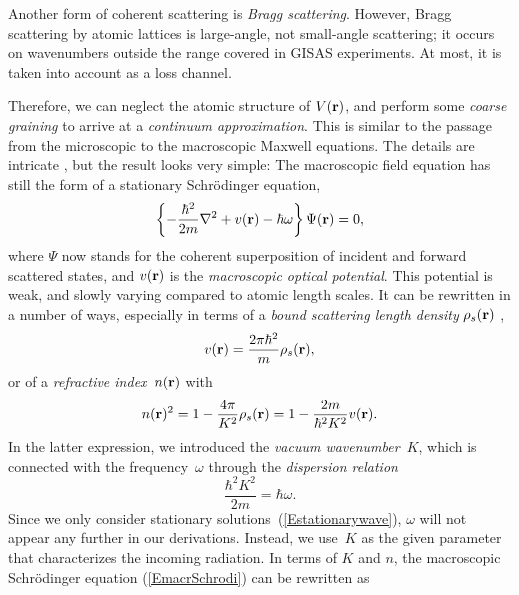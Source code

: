 Another form of coherent scattering is \textit{Bragg scattering}.%
However, Bragg scattering by atomic lattices
is large-angle, not small-angle scattering;
it occurs on wavenumbers outside the range covered in GISAS experiments.
At most, it is taken into account as a loss channel.

Therefore,
we can neglect the atomic structure of $V(\mathbf{r})$,
and perform some \textit{coarse graining} to
arrive at a \textit{continuum approximation}.%
This is 
similar to the passage from
the microscopic to the macroscopic Maxwell equations.
The details are intricate \cite{Sea89,Lax51},
but the result \cite[eq.~2.8.32]{Sea89} looks very simple:
The macroscopic field equation
has still the form of a stationary Schrödinger equation,
\begin{equation}\label{EmacrSchrodi}
  \left\{-\frac{\hbar^2}{2m}\mathbf{\nabla}^2+v(\mathbf{r})-\hbar\omega\right\} \Psi(\mathbf{r}) = 0,
\end{equation}
where $\Psi$ now stands for the coherent superposition of
incident and forward scattered states,
and $v(\mathbf{r})$ is the \textit{macroscopic optical potential}.%
This potential is weak, and slowly varying compared to atomic length scales.
It can be rewritten in a number of ways,
especially in terms of a
\textit{bound scattering length density}%
$\rho_s(\mathbf{r})$ \cite[eq.\ 2.8.37]{Sea89},
\begin{equation}
  v(\mathbf{r})=\frac{2\pi \hbar^2}{m}\rho_s(\mathbf{r}),  
\end{equation}
or of a \textit{refractive index}~$n(\mathbf{r})$%
with
\begin{equation}\label{EnRefrIndx}
  n(\mathbf{r})^2=1-\frac{4\pi}{K^2}\rho_s(\mathbf{r}) = 1 -\frac{2m}{\hbar^2 K^2}v(\mathbf{r}).
\end{equation}
In the latter expression,
we introduced the \textit{vacuum wavenumber}~$K$,
which is connected with the frequency~$\omega$ through the
\textit{dispersion relation}
\begin{equation}
  \frac{\hbar^2 K^2}{2m} = \hbar\omega.
\end{equation}
Since we only consider stationary solutions~(\ref{Estationarywave}),
$\omega$ will not appear any further in our derivations.
Instead, we use~$K$ as the given parameter that characterizes the
incoming radiation.
In terms of $K$ and $n$,
the macroscopic Schrödinger equation (\ref{EmacrSchrodi})
can be rewritten as

